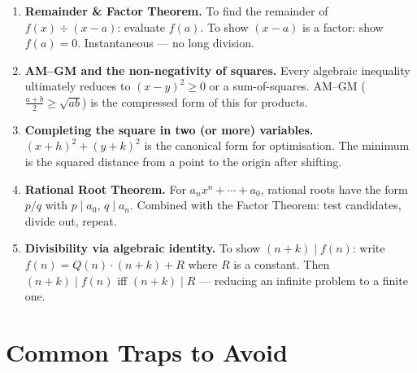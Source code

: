 \documentclass[11pt,a4paper]{article}
\begin{document}
\begin{enumerate}[leftmargin=2em, itemsep=5pt]
  \item \textbf{Remainder \& Factor Theorem.}
        To find the remainder of $f(x)\div(x-a)$: evaluate $f(a)$.
        To show $(x-a)$ is a factor: show $f(a)=0$. Instantaneous --- no long division. 

  \item \textbf{AM--GM and the non-negativity of squares.}
        Every algebraic inequality ultimately reduces to $(x-y)^2\geq0$ or a sum-of-squares.
        AM--GM ($\tfrac{a+b}{2}\geq\sqrt{ab}$) is the compressed form of this for products. 

  \item \textbf{Completing the square in two (or more) variables.}
        $(x+h)^2+(y+k)^2$ is the canonical form for optimisation.
        The minimum is the squared distance from a point to the origin after shifting. 

  \item \textbf{Rational Root Theorem.}
        For $a_nx^n+\cdots+a_0$, rational roots have the form $p/q$ with $p\mid a_0$, $q\mid a_n$.
        Combined with the Factor Theorem: test candidates, divide out, repeat. 

  \item \textbf{Divisibility via algebraic identity.}
        To show $(n+k)\mid f(n)$: write $f(n)=Q(n)\cdot(n+k)+R$ where $R$ is a constant.
        Then $(n+k)\mid f(n)$ iff $(n+k)\mid R$ --- reducing an infinite problem to a finite one. 
\end{enumerate}

\section*{Common Traps to Avoid}
\end{document}
